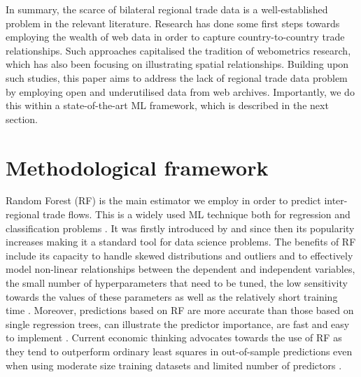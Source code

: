 \documentclass[]{interact}
\theoremstyle{plain}%
\theoremstyle{definition}
\theoremstyle{remark}
\begin{document}
In summary, the scarce of bilateral regional trade data is a
well-established problem in the relevant literature. Research has done
some first steps towards employing the wealth of web data in order to
capture country-to-country trade relationships. Such approaches
capitalised the tradition of webometrics research, which has also been
focusing on illustrating spatial relationships. Building upon such
studies, this paper aims to address the lack of regional trade data
problem by employing open and underutilised data from web archives.
Importantly, we do this within a state-of-the-art ML framework, which is
described in the next section.

\hypertarget{sec:3}{%
\section{Methodological framework}\label{sec:3}}

Random Forest (RF) is the main estimator we employ in order to predict
inter-regional trade flows. This is a widely used ML technique both for
regression and classification problems \citep{biau2012analysis}. It was
firstly introduced by \citet{breiman2001random} and since then its
popularity increases making it a standard tool for data science
problems. The benefits of RF include its capacity to handle skewed
distributions and outliers and to effectively model non-linear
relationships between the dependent and independent variables, the small
number of hyperparameters that need to be tuned, the low sensitivity
towards the values of these parameters as well as the relatively short
training time \citep{Caruana2008, liaw2002classification, yan2020using}.
Moreover, predictions based on RF are more accurate than those based on
single regression trees, can illustrate the predictor importance, are
fast and easy to implement
\citep{breiman2001random, sulaiman2011intelligent, pourebrahim2019trip, biau2012analysis}.
Current economic thinking advocates towards the use of RF as they tend
to outperform ordinary least squares in out-of-sample predictions even
when using moderate size training datasets and limited number of
predictors \citep{mullainathan2017machine, athey2019machine}.
\end{document}
